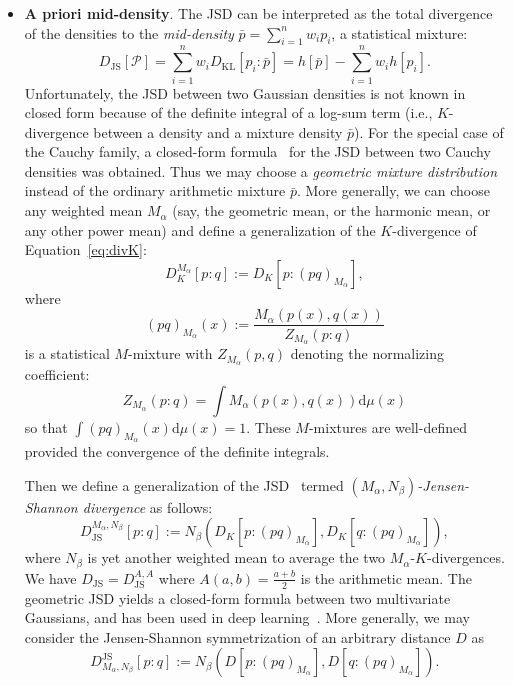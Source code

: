 \documentclass[11pt]{article}
\def\dmu{\mathrm{d}\mu}
\def\KL{\mathrm{KL}}
\def\calP{\mathcal{P}}
\def\dmu{\mathrm{d}\mu}
\def\KL{\mathrm{KL}}
\def\JS{\mathrm{JS}}
\begin{document}
\begin{itemize}
	
	\item {\bf A priori mid-density}. The JSD can be interpreted as the total divergence of the densities to the {\em mid-density} $\bar{p}=\sum_{i=1}^n w_i p_i$, a statistical mixture:
	$$
	D_\JS[\calP] = \sum_{i=1}^n w_i D_\KL[p_i:\bar{p}] = h[\bar{p}]-\sum_{i=1}^n w_i h[p_i].
	$$
	Unfortunately, the JSD between two Gaussian densities is not known in closed form because of the definite integral of a log-sum term (i.e., $K$-divergence between a density and a mixture density $\bar{p}$).
	For the special case of the Cauchy family,  a closed-form formula~\cite{CauchyJSD-2021} for the JSD between two Cauchy densities was obtained.
Thus we may choose a {\em geometric mixture distribution}~\cite{JSsym-2019} instead of the ordinary arithmetic mixture $\bar{p}$. More generally, we can choose any weighted mean $M_\alpha$ (say, the geometric mean, or the harmonic mean, or any other power mean) and define a generalization of the $K$-divergence of Equation~\ref{eq:divK}:
	\begin{equation}
	D_K^{M_\alpha}[p:q] := D_K[p:(pq)_{M_\alpha}],
	\end{equation}
	where 
	$$
	(pq)_{M_\alpha}(x):=\frac{M_\alpha(p(x),q(x))}{Z_{M_\alpha}(p:q)}
	$$
	 is a statistical $M$-mixture with $Z_{M_\alpha}(p,q)$
	denoting the normalizing coefficient:
	$$
	Z_{M_\alpha}(p:q)=\int M_\alpha(p(x),q(x))\dmu(x)
	$$ 
	so that $\int (pq)_{M_\alpha}(x)\dmu(x)=1$.
	These $M$-mixtures are well-defined provided the convergence of the definite integrals.
	
	Then we define a generalization of the JSD~\cite{JSsym-2019} termed {\em $(M_\alpha,N_\beta)$-Jensen-Shannon divergence} as follows:
		\begin{equation}
	D_\JS^{M_\alpha,N_\beta}[p:q ]:= N_\beta\left(D_K[p:(pq)_{M_\alpha}] , D_K[q:(pq)_{M_\alpha}]\right),
	\end{equation}
	where $N_\beta$ is yet another weighted mean to average the two $M_\alpha$-$K$-divergences. 
	We have $D_\JS=D_\JS^{A,A}$ where $A(a,b)=\frac{a+b}{2}$ is the arithmetic mean.
	The geometric JSD yields a closed-form formula between two multivariate Gaussians, and has been used in deep learning~\cite{VIGJSD-2020}.
		More generally, we may consider the Jensen-Shannon symmetrization of an arbitrary distance $D$ as  
			\begin{equation}
	D^\JS_{M_\alpha,N_\beta}[p:q]:= N_\beta\left(D[p:(pq)_{M_\alpha}],D[q:(pq)_{M_\alpha}]\right).
	\end{equation}
	

\end{itemize}
\end{document}
